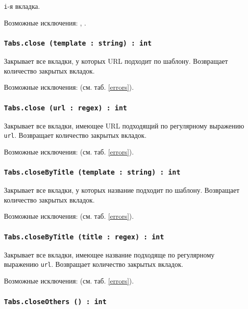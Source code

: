 \texttt{i}-я вкладка.

Возможные исключения: , .

\subsubsection{\texttt{Tabs.close (template : string) : int}}

Закрывает все вкладки, у которых URL подходит по шаблону. Возвращает количество закрытых вкладок.

Возможные исключения:  (см. таб. \ref{errors}).

\subsubsection{\texttt{Tabs.close (url : regex) : int}}

Закрывает все вкладки, имеющее URL подходящий по регулярному выражению \texttt{url}. Возвращает количество закрытых вкладок.

Возможные исключения:  (см. таб. \ref{errors}).

\subsubsection{\texttt{Tabs.closeByTitle (template : string) : int}}

Закрывает все вкладки, у которых название подходит по шаблону. Возвращает количество закрытых вкладок.

Возможные исключения:  (см. таб. \ref{errors}).

\subsubsection{\texttt{Tabs.closeByTitle (title : regex) : int}}

Закрывает все вкладки, имеющее название подходяще по регулярному выражению \texttt{url}. Возвращает количество закрытых вкладок.

Возможные исключения:  (см. таб. \ref{errors}).

\subsubsection{\texttt{Tabs.closeOthers () : int}}

